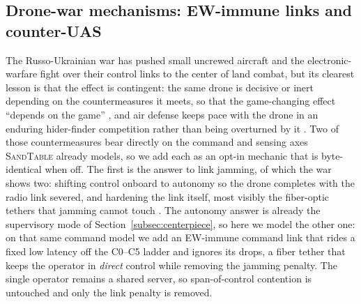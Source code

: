 \documentclass[11pt]{article}
\newcommand{\sandtable}{\textsc{SandTable}}
\begin{document}
\begin{table}[H]
\centering
\caption{Personality-movement propensities versus the scripted route planner on UC-3. The scripted planner traces a speed-survivability frontier between a fast, exposed corridor and a slow, covered route; the opt-in propensity mode recovers the fast corridor at $w_e{=}0$ and, at $w_e{=}1$, produces an emergent maneuver that matches the covered route's survivability at lower cost and shorter time. Time-to-objective is conditioned on success. Means over \personalityNRep{} replications.}
\label{tab:personality}

\end{table}

\subsection{Drone-war mechanisms: EW-immune links and counter-UAS}
\label{subsec:drone}

The Russo-Ukrainian war has pushed small uncrewed aircraft and the electronic-warfare fight over their control links to the center of land combat, but its clearest lesson is that the effect is contingent: the same drone is decisive or inert depending on the countermeasures it meets, so that the game-changing effect ``depends on the game'' \citep{kunertova2023depends}, and air defense keeps pace with the drone in an enduring hider-finder competition rather than being overturned by it \citep{calcara2022drones}. Two of those countermeasures bear directly on the command and sensing axes \sandtable{} already models, so we add each as an opt-in mechanic that is byte-identical when off. The first is the answer to link jamming, of which the war shows two: shifting control onboard to autonomy so the drone completes with the radio link severed, and hardening the link itself, most visibly the fiber-optic tethers that jamming cannot touch \citep{kunertova2023boots,bondar2025autonomy}. The autonomy answer is already the supervisory mode of Section~\ref{subsec:centerpiece}, so here we model the other one: on that same command model we add an EW-immune command link that rides a fixed low latency off the C0--C5 ladder and ignores its drops, a fiber tether that keeps the operator in \emph{direct} control while removing the jamming penalty. The single operator remains a shared server, so span-of-control contention is untouched and only the link penalty is removed.
\end{document}
